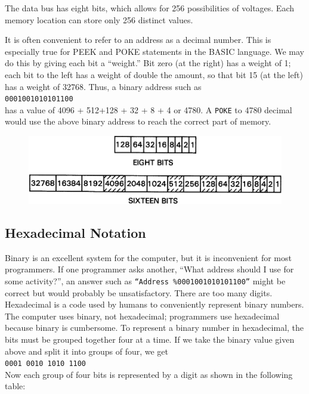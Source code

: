 \documentclass[11pt,a4paper,titlepage]{memoir}
\begin{document}
The data bus has eight bits, which allows for 256 possibilities of voltages.
Each memory location can store only 256 distinct values.

It is often convenient to refer to an address as a decimal number. This is
especially true for PEEK and POKE statements in the BASIC language.
We may do this by giving each bit a ``weight.'' Bit zero (at the right) has
a weight of 1; each bit to the left has a weight of double the amount, so
that bit 15 (at the left) has a weight of 32768. Thus, a binary address such
as\\

\texttt{0001001010101100}\\

has a value of 4096 + 512+128 + 32 + 8 + 4 or 4780. A \texttt{POKE} to 4780
decimal would use the above binary address to reach the correct part of
memory.
\begin{figure}[h]
	\centering
	\includegraphics[width=1\linewidth]{screenshot005}
	\caption{}
	\label{fig:screenshot005}
\end{figure}

\subsection{Hexadecimal Notation}
Binary is an excellent system for the computer, but it is inconvenient for
most programmers. If one programmer asks another, ``What address should I use for some activity?'', an answer such as \texttt{``Address \%0001001010101100''} might be correct but would probably be unsatisfactory. There are too many digits.
Hexadecimal is a code used by humans to conveniently represent binary
numbers. The computer uses binary, not hexadecimal; programmers use
hexadecimal because binary is cumbersome.
To represent a binary number in hexadecimal, the bits must be grouped
together four at a time. If we take the binary value given above and split
it into groups of four, we get\\

\texttt{0001 0010 1010 1100}\\

Now each group of four bits is represented by a digit as shown in the
following table:\\
\end{document}
